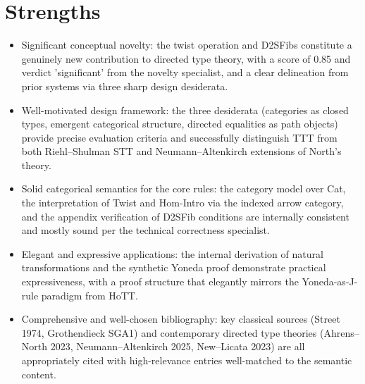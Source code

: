 \documentclass[11pt]{article}
\begin{document}
\section*{Strengths}
\begin{itemize}[leftmargin=*]
  \item Significant conceptual novelty: the twist operation and D2SFibs constitute a genuinely new contribution to directed type theory, with a score of 0.85 and verdict 'significant' from the novelty specialist, and a clear delineation from prior systems via three sharp design desiderata.
  \item Well-motivated design framework: the three desiderata (categories as closed types, emergent categorical structure, directed equalities as path objects) provide precise evaluation criteria and successfully distinguish TTT from both Riehl–Shulman STT and Neumann–Altenkirch extensions of North's theory.
  \item Solid categorical semantics for the core rules: the category model over Cat, the interpretation of Twist and Hom-Intro via the indexed arrow category, and the appendix verification of D2SFib conditions are internally consistent and mostly sound per the technical correctness specialist.
  \item Elegant and expressive applications: the internal derivation of natural transformations and the synthetic Yoneda proof demonstrate practical expressiveness, with a proof structure that elegantly mirrors the Yoneda-as-J-rule paradigm from HoTT.
  \item Comprehensive and well-chosen bibliography: key classical sources (Street 1974, Grothendieck SGA1) and contemporary directed type theories (Ahrens–North 2023, Neumann–Altenkirch 2025, New–Licata 2023) are all appropriately cited with high-relevance entries well-matched to the semantic content.
\end{itemize}
\end{document}
